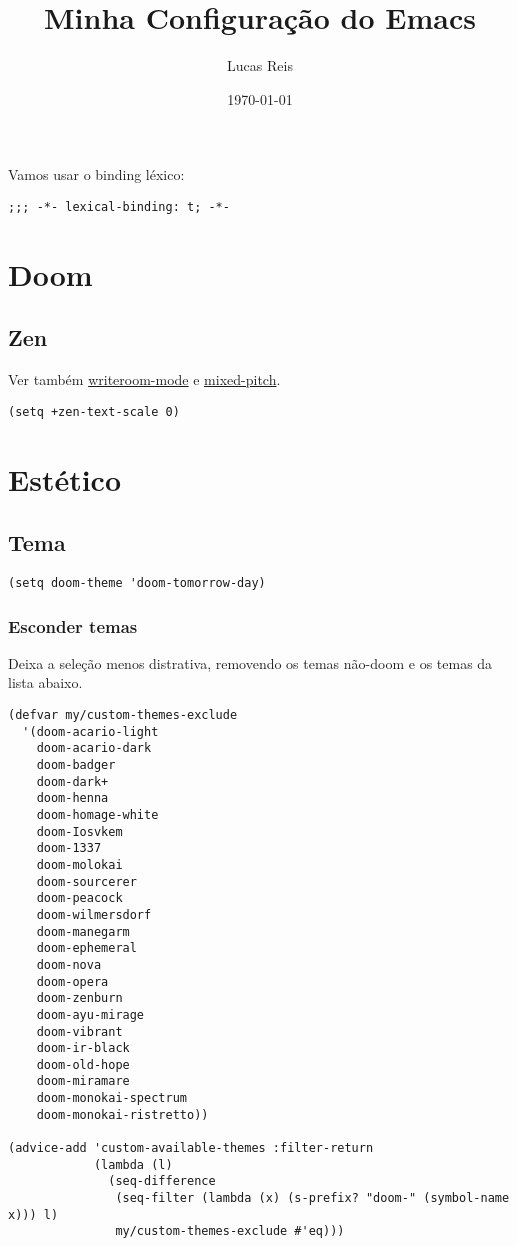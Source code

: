 \documentclass[11pt]{article}
\author{Lucas Reis}
\date{\today}
\title{Minha Configuração do Emacs}
\begin{document}
\maketitle
\tableofcontents

Vamos usar o binding léxico:
\begin{verbatim}
;;; -*- lexical-binding: t; -*-
\end{verbatim}

\section{Doom}
\label{sec:orge9ac282}
\subsection{Zen}
\label{sec:org76d1931}
Ver também \href{lisp/minor/writeroom-mode.el}{writeroom-mode} e \href{lisp/minor/mixed-pitch.el}{mixed-pitch}.
\begin{verbatim}
(setq +zen-text-scale 0)
\end{verbatim}

\section{Estético}
\label{sec:orge173df1}
\subsection{Tema}
\label{sec:orgdb6752c}
\begin{verbatim}
(setq doom-theme 'doom-tomorrow-day)
\end{verbatim}

\subsubsection{Esconder temas}
\label{sec:org5cf09e5}

Deixa a seleção menos distrativa, removendo os temas não-doom e os temas da
lista abaixo.

\begin{verbatim}
(defvar my/custom-themes-exclude
  '(doom-acario-light
    doom-acario-dark
    doom-badger
    doom-dark+
    doom-henna
    doom-homage-white
    doom-Iosvkem
    doom-1337
    doom-molokai
    doom-sourcerer
    doom-peacock
    doom-wilmersdorf
    doom-manegarm
    doom-ephemeral
    doom-nova
    doom-opera
    doom-zenburn
    doom-ayu-mirage
    doom-vibrant
    doom-ir-black
    doom-old-hope
    doom-miramare
    doom-monokai-spectrum
    doom-monokai-ristretto))

(advice-add 'custom-available-themes :filter-return
            (lambda (l)
              (seq-difference
               (seq-filter (lambda (x) (s-prefix? "doom-" (symbol-name x))) l)
               my/custom-themes-exclude #'eq)))
\end{verbatim}
\end{document}
